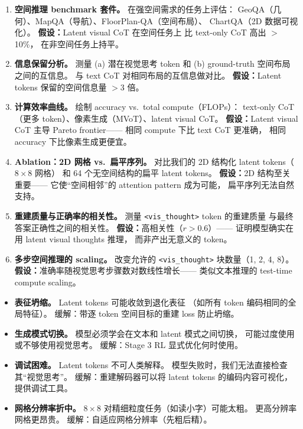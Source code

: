 \documentclass[12pt,a4paper]{article}
\begin{document}
\begin{expbox}
\begin{enumerate}[leftmargin=1.5em]
  \item \textbf{空间推理 benchmark 套件。}
    在强空间需求的任务上评估：
    GeoQA（几何）、MapQA（导航）、FloorPlan-QA（空间布局）、
    ChartQA（2D 数据可视化）。
    \textbf{假设：}Latent visual CoT 在空间任务上
    比 text-only CoT 高出 $>$10\%，
    在非空间任务上持平。

  \item \textbf{信息保留分析。}
    测量 (a) 潜在视觉思考 token 和
    (b) ground-truth 空间布局之间的互信息。
    与 text CoT 对相同布局的互信息做对比。
    \textbf{假设：}Latent tokens 保留的空间信息量 $>$3 倍。

  \item \textbf{计算效率曲线。}
    绘制 accuracy vs.\ total compute（FLOPs）：
    text-only CoT（更多 token）、像素生成（MVoT）、latent visual CoT。
    \textbf{假设：}Latent visual CoT 主导 Pareto frontier——
    相同 compute 下比 text CoT 更准确，
    相同 accuracy 下比像素生成更便宜。

  \item \textbf{Ablation：2D 网格 vs.\ 扁平序列。}
    对比我们的 2D 结构化 latent tokens（$8 \times 8$ 网格）
    和 64 个无空间结构的扁平 latent tokens。
    \textbf{假设：}2D 结构至关重要——
    它使``空间相邻''的 attention pattern 成为可能，
    扁平序列无法自然支持。

  \item \textbf{重建质量与正确率的相关性。}
    测量 \texttt{<vis\_thought>} token 的重建质量
    与最终答案正确性之间的相关性。
    \textbf{假设：}高相关性（$r > 0.6$）——
    证明模型确实在用 latent visual thoughts 推理，
    而非产出无意义的 token。

  \item \textbf{多步空间推理的 scaling。}
    改变允许的 \texttt{<vis\_thought>} 块数量（1, 2, 4, 8）。
    \textbf{假设：}准确率随视觉思考步骤数对数线性增长——
    类似文本推理的 test-time compute scaling。
\end{enumerate}
\end{expbox}

\begin{riskbox}
\begin{itemize}[leftmargin=1.5em]
  \item \textbf{表征坍缩。}
    Latent tokens 可能收敛到退化表征
    （如所有 token 编码相同的全局特征）。
    缓解：带逐 token 空间目标的重建 loss 防止坍缩。
  \item \textbf{生成模式切换。}
    模型必须学会在文本和 latent 模式之间切换，
    可能过度使用或不够使用视觉思考。
    缓解：Stage 3 RL 显式优化何时使用。
  \item \textbf{调试困难。}
    Latent tokens 不可人类解释。
    模型失败时，我们无法直接检查其``视觉思考''。
    缓解：重建解码器可以将 latent tokens 的编码内容可视化，
    提供调试工具。
  \item \textbf{网格分辨率折中。}
    $8 \times 8$ 对精细粒度任务（如读小字）可能太粗。
    更高分辨率网格更昂贵。
    缓解：自适应网格分辨率（先粗后精）。
\end{itemize}
\end{riskbox}
\end{document}
